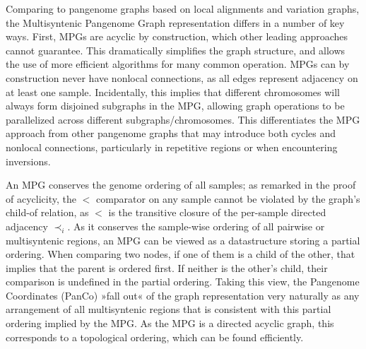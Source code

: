 Comparing to pangenome graphs based on local alignments and variation graphs, the Multisyntenic Pangenome Graph representation differs in a number of key ways.
First, MPGs are acyclic by construction, which other leading approaches cannot guarantee.
This dramatically simplifies the graph structure, and allows the use of more efficient algorithms for many common operation.
MPGs can by construction never have nonlocal connections, as all edges represent adjacency on at least one sample.
Incidentally, this implies that different chromosomes will always form disjoined subgraphs in the MPG, allowing graph operations to be parallelized across different subgraphs/chromosomes.
This differentiates the MPG approach from other pangenome graphs that may introduce both cycles and nonlocal connections, particularly in repetitive regions or when encountering inversions.

An MPG conserves the genome ordering of all samples; as remarked in the proof of acyclicity, the $<$ comparator on any sample cannot be violated by the graph's child-of relation, as $<$ is the transitive closure of the per-sample directed adjacency $\prec_i$.
As it conserves the sample-wise ordering of all pairwise or multisyntenic regions, an MPG can be viewed as a datastructure storing a partial ordering.
When comparing two nodes, if one of them is a child of the other, that implies that the parent is ordered first.
If neither is the other's child, their comparison is undefined in the partial ordering.
Taking this view, the Pangenome Coordinates (PanCo) »fall out« of the graph representation very naturally as any arrangement of all multisyntenic regions that is consistent with this partial ordering implied by the MPG.
As the MPG is a directed acyclic graph, this corresponds to a topological ordering, which can be found efficiently. %

